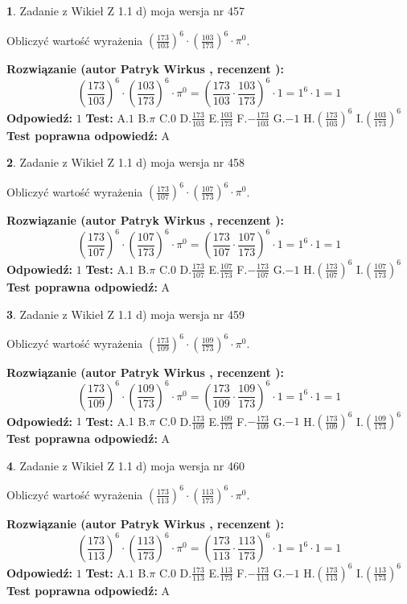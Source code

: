 \documentclass[12pt, a4paper]{article}
\theoremstyle{definition} %
\newtheorem{zad}{}
\newcommand{\zadStart}[1]{\begin{zad}#1\newline}
\newcommand{\zadStop}{\end{zad}}
\newcommand{\rozwStart}[2]{\noindent \textbf{Rozwiązanie (autor #1 , recenzent #2): }\newline}
\newcommand{\rozwStop}{\newline}
\newcommand{\odpStart}{\noindent \textbf{Odpowiedź:}\newline}
\newcommand{\odpStop}{\newline}
\newcommand{\testStart}{\noindent \textbf{Test:}\newline}
\newcommand{\testStop}{\newline}
\newcommand{\kluczStart}{\noindent \textbf{Test poprawna odpowiedź:}\newline}
\newcommand{\kluczStop}{\newline}
\begin{document}
\zadStart{Zadanie z Wikieł Z 1.1 d) moja wersja nr 457}

Obliczyć wartość wyrażenia $(\frac{173}{103})^{6} \cdot (\frac{103}{173})^{6} \cdot \pi^{0}$.
\zadStop
\rozwStart{Patryk Wirkus}{}
$$(\frac{173}{103})^{6} \cdot (\frac{103}{173})^{6} \cdot \pi^{0} = (\frac{173}{103} \cdot \frac{103}{173})^{6} \cdot 1 = 1^{6} \cdot 1 = 1$$
\rozwStop
\odpStart
$1$
\odpStop
\testStart
A.$1$ B.$\pi$ C.$0$ D.$\frac{173}{103}$ E.$\frac{103}{173}$
F.$-\frac{173}{103}$ G.$-1$
H.$(\frac{173}{103})^{6}$
I.$(\frac{103}{173})^{6}$
\testStop
\kluczStart
A
\kluczStop



\zadStart{Zadanie z Wikieł Z 1.1 d) moja wersja nr 458}

Obliczyć wartość wyrażenia $(\frac{173}{107})^{6} \cdot (\frac{107}{173})^{6} \cdot \pi^{0}$.
\zadStop
\rozwStart{Patryk Wirkus}{}
$$(\frac{173}{107})^{6} \cdot (\frac{107}{173})^{6} \cdot \pi^{0} = (\frac{173}{107} \cdot \frac{107}{173})^{6} \cdot 1 = 1^{6} \cdot 1 = 1$$
\rozwStop
\odpStart
$1$
\odpStop
\testStart
A.$1$ B.$\pi$ C.$0$ D.$\frac{173}{107}$ E.$\frac{107}{173}$
F.$-\frac{173}{107}$ G.$-1$
H.$(\frac{173}{107})^{6}$
I.$(\frac{107}{173})^{6}$
\testStop
\kluczStart
A
\kluczStop



\zadStart{Zadanie z Wikieł Z 1.1 d) moja wersja nr 459}

Obliczyć wartość wyrażenia $(\frac{173}{109})^{6} \cdot (\frac{109}{173})^{6} \cdot \pi^{0}$.
\zadStop
\rozwStart{Patryk Wirkus}{}
$$(\frac{173}{109})^{6} \cdot (\frac{109}{173})^{6} \cdot \pi^{0} = (\frac{173}{109} \cdot \frac{109}{173})^{6} \cdot 1 = 1^{6} \cdot 1 = 1$$
\rozwStop
\odpStart
$1$
\odpStop
\testStart
A.$1$ B.$\pi$ C.$0$ D.$\frac{173}{109}$ E.$\frac{109}{173}$
F.$-\frac{173}{109}$ G.$-1$
H.$(\frac{173}{109})^{6}$
I.$(\frac{109}{173})^{6}$
\testStop
\kluczStart
A
\kluczStop



\zadStart{Zadanie z Wikieł Z 1.1 d) moja wersja nr 460}

Obliczyć wartość wyrażenia $(\frac{173}{113})^{6} \cdot (\frac{113}{173})^{6} \cdot \pi^{0}$.
\zadStop
\rozwStart{Patryk Wirkus}{}
$$(\frac{173}{113})^{6} \cdot (\frac{113}{173})^{6} \cdot \pi^{0} = (\frac{173}{113} \cdot \frac{113}{173})^{6} \cdot 1 = 1^{6} \cdot 1 = 1$$
\rozwStop
\odpStart
$1$
\odpStop
\testStart
A.$1$ B.$\pi$ C.$0$ D.$\frac{173}{113}$ E.$\frac{113}{173}$
F.$-\frac{173}{113}$ G.$-1$
H.$(\frac{173}{113})^{6}$
I.$(\frac{113}{173})^{6}$
\testStop
\kluczStart
A
\kluczStop
\end{document}
